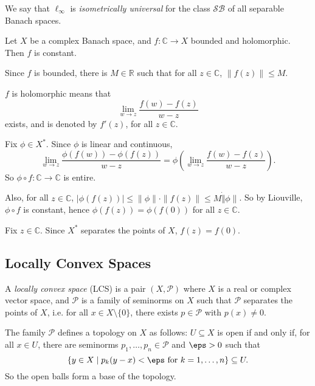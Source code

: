 \documentclass[12pt]{article}
\begin{document}
\begin{remark}
	We say that $\ell_\infty$ is \emph{isometrically universal} for the class $\mathcal{SB}$ of all separable Banach spaces.
\end{remark}

\begin{theorem}
	Let $X$ be a complex Banach space, and $f : \mathbb{C} \to X$ bounded and holomorphic. Then $f$ is constant.
\end{theorem}

\begin{proofbox}
	Since $f$ is bounded, there is $M \in \mathbb{R}$ such that for all $z \in \mathbb{C}$, $\|f(z)\| \leq M$.

	$f$ is holomorphic means that
	\[
	\lim_{w \to z} \frac{f(w) - f(z)}{w - z}
	\]
	exists, and is denoted by $f'(z)$, for all $z \in \mathbb{C}$.

	Fix $\phi \in X^\ast$. Since $\phi$ is linear and continuous,
	\[
	\lim_{w \to z} \frac{\phi(f(w)) - \phi(f(z))}{w - z} = \phi \left( \lim_{w \to z} \frac{f(w) - f(z)}{w - z} \right).
	\]
	So $\phi \circ f : \mathbb{C} \to \mathbb{C}$ is entire.

	Also, for all $z \in \mathbb{C}$, $|\phi(f(z))| \leq \|\phi\| \cdot \|f(z)\| \leq M \dot \|\phi\|$. So by Liouville, $\phi \circ f$ is constant, hence $\phi(f(z)) =\phi(f(0))$ for all $z \in \mathbb{C}$.

	Fix $z \in \mathbb{C}$. Since $X^\ast$ separates the points of $X$, $f(z) = f(0)$.
\end{proofbox}


\subsection{Locally Convex Spaces}%
\label{sub:lcs}

\begin{definition}
	A \emph{locally convex space} (LCS) is a pair $(X, \mathcal{P})$ where $X$ is a real or complex vector space, and $\mathcal{P}$ is a family of seminorms on $X$ such that $\mathcal{P}$ separates the points of $X$, i.e. for all $x \in X \setminus \{0\}$, there exists $p \in \mathcal{P}$ with $p(x) \neq 0$.
\end{definition}

The family $\mathcal{P}$ defines a topology on $X$ as follows: $U \subseteq X$ is open if and only if, for all $x \in U$, there are seminorms $p_1, \ldots, p_n \in \mathcal{P}$ and $\eps > 0$ such that
\[
	\{y \in X \mid p_k(y - x) < \eps \text{ for } k = 1, \ldots, n\} \subseteq U.
\]
So the open balls form a base of the topology.
\end{document}
